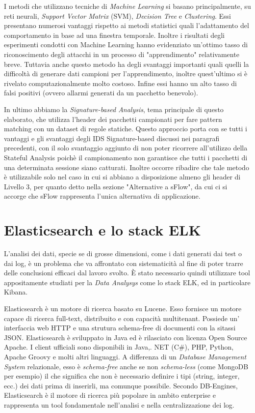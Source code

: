 \documentclass[12pt,a4paper,openright,twoside]{report}
\begin{document}
I metodi che utilizzano tecniche di {\it Machine Learning} si basano principalmente,
su reti neurali, {\it Support Vector Matrix } (SVM), {\it Decision Tree} e {\it Clustering}.
Essi presentano numerosi vantaggi rispetto ai metodi statistici quali l'adattamento
del comportamento in base ad una finestra temporale. Inoltre i risultati degli esperimenti
condotti con Machine Learning hanno evidenziato un'ottimo tasso di riconoscimento degli
attacchi in un processo di "apprendimento" relativamente breve. Tuttavia anche questo metodo
ha degli svantaggi importanti quali quelli la difficolt\`a di generare dati campioni per
l'apprendimento, inoltre quest'ultimo si \`e rivelato computazionalmente molto costoso.
Infine essi hanno un alto tasso di falsi positivi (ovvero allarmi generati da un pacchetto
benevolo).

In ultimo abbiamo la {\it Signature-based Analysis}, tema principale di questo elaborato,
che utilizza l'header dei pacchetti campionati per fare pattern matching con un dataset
di regole statiche. Questo approccio porta con se tutti i vantaggi e gli svantaggi
degli IDS Signature-based discussi nei paragrafi precedenti, con il solo svantaggio aggiunto di
non poter ricorrere all'utilizzo della Stateful Analysis poich\`e il campionamento
non garantisce che tutti i pacchetti di una determinata sessione siano catturati.
Inoltre occorre ribadire che tale metodo \`e utilizzabile solo nel caso in cui si abbiano a disposizione
almeno gli header di Livello 3, per quanto detto nella sezione "Alternative a sFlow",
da cui ci si accorge che sFlow rappresenta l'unica alternativa di applicazione.


\newpage

\section{Elasticsearch e lo stack ELK}

L'analisi dei dati, specie se di grosse dimensioni, come i dati generati dai test o
dai log, \`e un problema che va affrontato con sistematicit\`a al fine di poter
trarre delle conclusioni efficaci dal lavoro svolto. \`E stato necessario quindi
utilizzare tool appositamente studiati per la {\it Data Analysys} come lo stack ELK, ed
in particolare Kibana.

Elasticsearch \cite{E1} \`e un motore di ricerca basato su Lucene. Esso fornisce un
motore capace di ricerca full-text, distribuito e con capacit\`a multitenant.
Possiede un' interfaccia web HTTP e una strutura schema-free di documenti con la sitassi JSON.
Elasticsearch \`e sviluppato in Java ed \`e rilasciato con licenza Open Source Apache.
I client ufficiali sono disponibili in Java,. NET (C#), PHP, Python, Apache Groovy e molti altri
linguaggi.
A differenza di un {\it Database Management System} relazionale, esso \`e {\it schema-free}
anche se non {\it schema-less} (come MongoDB per esempio) il che significa che non \`e
necessario definire i tipi (string, integer, ecc.) dei dati prima di inserirli,
ma comunque possibile. \cite{E4}
Secondo DB-Engines, \cite{E2} Elasticsearch \`e il motore di ricerca pi\`u popolare in ambito enterprise e
rappresenta un tool fondamentale nell'analisi e nella centralizzazione dei log.
\end{document}

